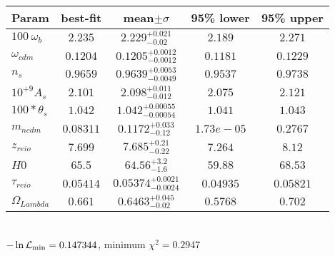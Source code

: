\begin{tabular}{|l|c|c|c|c|} 
 \hline 
Param & best-fit & mean$\pm\sigma$ & 95\% lower & 95\% upper \\ \hline 
$100~\omega{}_{b }$ &$2.235$ & $2.229_{-0.02}^{+0.021}$ & $2.189$ & $2.271$ \\ 
$\omega{}_{cdm }$ &$0.1204$ & $0.1205_{-0.0012}^{+0.0012}$ & $0.1181$ & $0.1229$ \\ 
$n_{s }$ &$0.9659$ & $0.9639_{-0.0049}^{+0.0053}$ & $0.9537$ & $0.9738$ \\ 
$10^{+9}A_{s }$ &$2.101$ & $2.098_{-0.012}^{+0.011}$ & $2.075$ & $2.121$ \\ 
$100*\theta{}_{s }$ &$1.042$ & $1.042_{-0.00054}^{+0.00055}$ & $1.041$ & $1.043$ \\ 
$m_{ncdm }$ &$0.08311$ & $0.1172_{-0.12}^{+0.033}$ & $1.73e-05$ & $0.2767$ \\ 
$z_{reio }$ &$7.699$ & $7.685_{-0.22}^{+0.21}$ & $7.264$ & $8.12$ \\ 
$H0$ &$65.5$ & $64.56_{-1.6}^{+3.2}$ & $59.88$ & $68.53$ \\ 
$\tau{}_{reio }$ &$0.05414$ & $0.05374_{-0.0024}^{+0.0021}$ & $0.04935$ & $0.05821$ \\ 
$\Omega{}_{Lambda }$ &$0.661$ & $0.6463_{-0.02}^{+0.045}$ & $0.5768$ & $0.702$ \\ 
\hline 
 \end{tabular} \\ 
$-\ln{\cal L}_\mathrm{min} =0.147344$, minimum $\chi^2=0.2947$ \\ 
